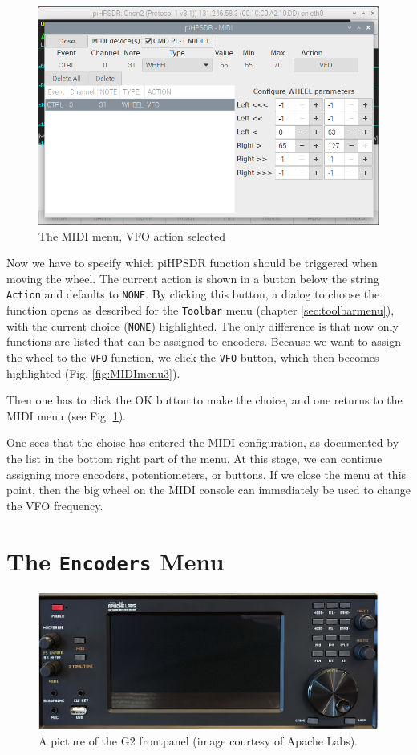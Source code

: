 \documentclass[12pt]{book}
\def\rett#1{\texttt{\color{red}#1}}
\def\bltt#1{\texttt{\color{blue}#1}}
\begin{document}
\begin{figure}[ht!]
\center
\includegraphics[width=12cm]{MIDImenu4.png}
\caption{The MIDI menu, VFO action selected}
\label{fig:MIDImenu4}
\end{figure}
Now we have to specify which piHPSDR function should be triggered when moving the wheel.
The current action is shown in a button below the string \rett{Action} and defaults to \bltt{NONE}.
By clicking this button, a dialog to choose the function opens as described for the
\bltt{Toolbar} menu (chapter \ref{sec:toolbarmenu}), with the current choice (\bltt{NONE})
highlighted. The only difference is that now only functions are listed that can be
assigned to encoders.
Because we want to assign the wheel to the \bltt{VFO} function, we click
the \bltt{VFO} button, which then becomes highlighted (Fig. \ref{fig:MIDImenu3}).



 Then one has to click the OK button to make the choice, and one returns to the
 MIDI menu (see Fig. \ref{fig:MIDImenu4}).

One sees that the choise has entered the MIDI configuration, as documented by the
list in the bottom right part of the menu. At this stage, we can continue
assigning more encoders, potentiometers, or buttons. If we close the menu at
this point, then the big wheel on the MIDI console can immediately be used
to change the VFO frequency.

\section{The \texttt{Encoders} Menu}
\begin{figure}[ht!]
\center
\includegraphics[width=12cm]{g2_frontpanel.png}
\caption{A picture of the G2 frontpanel (image courtesy of Apache Labs).}
\label{fig:g2_frontpanel}
\end{figure}
\end{document}
